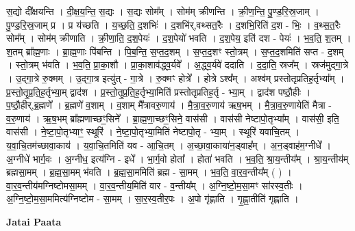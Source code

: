 \documentclass[17pt]{extarticle}
\begin{document}
स॒द्यो दी᳚क्षयन्ति । दी॒क्ष॒य॒न्ति॒ स॒द्यः । स॒द्यः सोम᳚म् । सोम॑म् क्रीणन्ति । क्री॒ण॒न्ति॒ पु॒ण्ड॒रि॒स्र॒जाम् । पु॒ण्ड॒रि॒स्र॒जाम् प्र । प्र य॑च्छति । य॒च्छ॒ति॒ द॒शभिः॑ । द॒शभि॑र्,वथ्सत॒रैः । द॒शभि॒रिति॑ द॒श - भिः॒ । व॒थ्स॒त॒रैः सोम᳚म् । सोम॑म् क्रीणाति । क्री॒णा॒ति॒ द॒श॒पेयः॑ । द॒श॒पेयो॑ भवति । द॒श॒पेय॒ इति॑ दश - पेयः॑ । भ॒व॒ति॒ श॒तम् । श॒तम् ब्रा᳚ह्म॒णाः । ब्रा॒ह्म॒णाः पि॑बन्ति । पि॒ब॒न्ति॒ स॒प्त॒द॒शम् । स॒प्त॒द॒शꣳ स्तो॒त्रम् । स॒प्त॒द॒शमिति॑ सप्त - द॒शम् । स्तो॒त्रम् भ॑वति । भ॒व॒ति॒ प्रा॒का॒शौ । प्रा॒का॒शाव॑द्ध्व॒र्यवे᳚ । अ॒द्ध्व॒र्यवे॑ ददाति । द॒दा॒ति॒ स्रज᳚म् । स्रज॑मुद्गा॒त्रे । उ॒द्गा॒त्रे रु॒क्मम् । उ॒द्गा॒त्र इत्यु॑त् - गा॒त्रे । रु॒क्मꣳ होत्रे᳚ । होत्रे ऽश्व᳚म् । अश्व॑म् प्रस्तोतृप्रतिह॒र्तृभ्या᳚म् । प्र॒स्तो॒तृ॒प्र॒ति॒ह॒र्तृभ्या॒म् द्वाद॑श । प्र॒स्तो॒तृ॒प्र॒ति॒ह॒र्तृभ्या॒मिति॑ प्रस्तोतृप्रतिह॒र्तृ - भ्या॒म् । द्वाद॑श पष्ठौ॒हीः । प॒ष्ठौ॒हीर्,ब्र॒ह्मणे᳚ । ब्र॒ह्मणे॑ व॒शाम् । व॒शाम् मै᳚त्रावरु॒णाय॑ । मै॒त्रा॒व॒रु॒णाय॑ ऋष॒भम् । मै॒त्रा॒व॒रु॒णायेति॑ मैत्रा - व॒रु॒णाय॑ । ऋ॒ष॒भम् ब्रा᳚ह्मणाच्छꣳ॒॒सिने᳚ । ब्रा॒ह्म॒णा॒च्छꣳ॒॒सिने॒ वास॑सी । वास॑सी नेष्टापो॒तृभ्या᳚म् । वास॑सी॒ इति॒ वास॑सी । ने॒ष्टा॒पो॒तृभ्याꣳ॒॒ स्थूरि॑ । ने॒ष्टा॒पो॒तृभ्या॒मिति॑ नेष्टापो॒तृ - भ्या॒म् । स्थूरि॑ यवाचि॒तम् । य॒वा॒चि॒तम॑च्छावा॒काय॑ । य॒वा॒चि॒तमिति॑ यव - आ॒चि॒तम् । अ॒च्छा॒वा॒काया॑न॒ड्वाह᳚म् । अ॒न॒ड्वाह॑म॒ग्नीधे᳚ । अ॒ग्नीधे॑ भार्ग॒वः । अ॒ग्नीध॒ इत्य॑ग्नि - इधे᳚ । भा॒र्ग॒वो होता᳚ । होता॑ भवति । भ॒व॒ति॒ श्रा॒य॒न्तीय᳚म् । श्रा॒य॒न्तीय॑म् ब्रह्मसा॒मम् । ब्र॒ह्म॒सा॒मम् भ॑वति । ब्र॒ह्म॒सा॒ममिति॑ ब्रह्म - सा॒मम् । भ॒व॒ति॒ वा॒र॒व॒न्तीय᳚म् ( ) । वा॒र॒व॒न्तीय॑मग्निष्टोमसा॒मम् । वा॒र॒व॒न्तीय॒मिति॑ वार - व॒न्तीय᳚म् । अ॒ग्नि॒ष्टो॒म॒सा॒मꣳ सा॑रस्व॒तीः । अ॒ग्नि॒ष्टो॒म॒सा॒ममित्य॑ग्निष्टोम - सा॒मम् । सा॒र॒स्व॒तीर॒पः । अ॒पो गृ॑ह्णाति । गृ॒ह्णा॒तीति॑ गृह्णाति । \newline

\textbf{Jatai Paata} \newline
\end{document}
